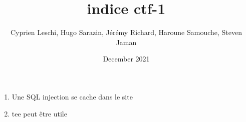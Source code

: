 \documentclass{article}
\title{indice ctf-1}
\author{Cyprien Leschi, Hugo Sarazin, Jérémy Richard, Haroune Samouche, Steven Jaman}
\date{December 2021}
\begin{document}
\maketitle

\begin{enumerate}
    \item Une SQL injection se cache dans le site
    \item tee peut être utile 
\end{enumerate}
\end{document}
